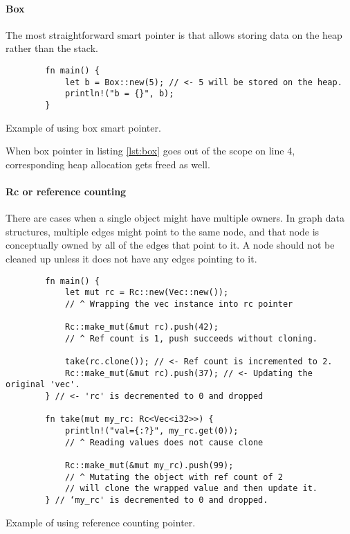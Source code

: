 \paragraph{Box}
The most straightforward smart pointer is  that allows storing data on the heap rather than the stack.

\begin{listing}[!htbp]

    \centering
    \begin{verbatim}
        fn main() {
            let b = Box::new(5); // <- 5 will be stored on the heap.
            println!("b = {}", b);
        }
    \end{verbatim}

    \caption{Example of using box smart pointer.}
    \label{lst:box}
\end{listing}

When box pointer in listing \ref{lst:box} goes out of the scope on line 4, corresponding heap allocation gets freed as well.

\paragraph{Rc or reference counting}
There are cases when a single object might have multiple owners. In graph data structures, multiple edges might point to the same node, and that node is conceptually owned by all of the edges that point to it. A node should not be cleaned up unless it does not have any edges pointing to it.

\begin{listing}[!htbp]

    \centering
    \begin{verbatim}
        fn main() {
            let mut rc = Rc::new(Vec::new());
            // ^ Wrapping the vec instance into rc pointer

            Rc::make_mut(&mut rc).push(42);
            // ^ Ref count is 1, push succeeds without cloning.

            take(rc.clone()); // <- Ref count is incremented to 2.
            Rc::make_mut(&mut rc).push(37); // <- Updating the original 'vec'.
        } // <- 'rc' is decremented to 0 and dropped

        fn take(mut my_rc: Rc<Vec<i32>>) {
            println!("val={:?}", my_rc.get(0));
            // ^ Reading values does not cause clone

            Rc::make_mut(&mut my_rc).push(99);
            // ^ Mutating the object with ref count of 2
            // will clone the wrapped value and then update it.
        } // ‘my_rc' is decremented to 0 and dropped.
    \end{verbatim}

    \caption{Example of using reference counting pointer.}
    \label{lst:rc}
\end{listing}

